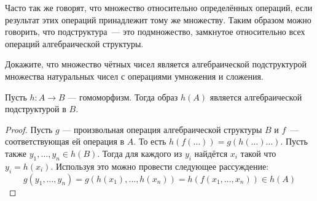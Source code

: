 Часто так же говорят, что множество  относительно определённых операций, если результат этих операций принадлежит тому же множеству. Таким образом можно говорить, что подструктура~--- это подмножество, замкнутое относительно всех операций алгебраической структуры.

\begin{exercise}
	Докажите, что множество чётных чисел является алгебраической подструктурой множества натуральных чисел с операциями умножения и сложения.
\end{exercise}

\begin{thm}
	Пусть $h:A\to B$ --- гомоморфизм. Тогда образ $h(A)$ является алгебраической подструктурой в $B$.
\end{thm}
\begin{proof}
	Пусть $g$ --- произвольная операция алгебраической структуры $B$ и $f$~--- соответствующая ей операция в $A$. То есть $h(f(\ldots))=g(h(\ldots)\ldots)$. Пусть также $y_1,\ldots,y_n\in h(B)$. Тогда для каждого из $y_i$ найдётся $x_i$ такой что $y_i=h(x_i)$. Используя это можно провести следующее рассуждение:
	\[
	g(y_1,\ldots,y_n) = g(h(x_1),\ldots,h(x_n)) = h(f(x_1,\ldots,x_n)) \in h(A)
	\]
\end{proof}